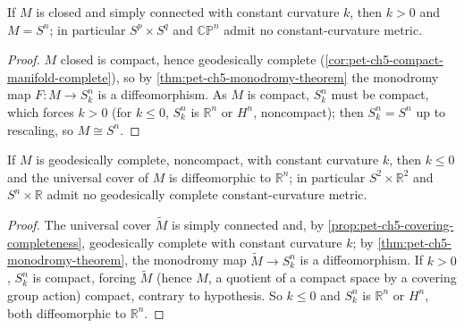 \begin{corollary}
  \label{cor:pet-ch5-closed-simply-connected-constant-curvature}
  If $M$ is closed and simply connected with constant curvature $k$, then $k>0$
  and $M=S^n$; in particular $S^p\times S^q$ and $\mathbb{CP}^n$ admit no
  constant-curvature metric.
\end{corollary}
\begin{proof}
  $M$ closed is compact, hence geodesically complete
  (\cref{cor:pet-ch5-compact-manifold-complete}), so by
  \cref{thm:pet-ch5-monodromy-theorem} the monodromy map $F:M\to S^n_k$ is a
  diffeomorphism. As $M$ is compact, $S^n_k$ must be compact, which forces $k>0$
  (for $k\le0$, $S^n_k$ is $\mathbb R^n$ or $H^n$, noncompact); then $S^n_k=S^n$ up
  to rescaling, so $M\cong S^n$.
\end{proof}

\begin{corollary}
  \label{cor:pet-ch5-noncompact-constant-curvature}
  If $M$ is geodesically complete, noncompact, with constant curvature $k$, then
  $k\le0$ and the universal cover of $M$ is diffeomorphic to $\mathbb R^n$; in
  particular $S^2\times\mathbb R^2$ and $S^n\times\mathbb R$ admit no geodesically
  complete constant-curvature metric.
\end{corollary}
\begin{proof}
  The universal cover $\tilde M$ is simply connected and, by
  \cref{prop:pet-ch5-covering-completeness}, geodesically complete with constant
  curvature $k$; by \cref{thm:pet-ch5-monodromy-theorem}, the monodromy map
  $\tilde M\to S^n_k$ is a diffeomorphism. If $k>0$, $S^n_k$ is compact, forcing
  $\tilde M$ (hence $M$, a quotient of a compact space by a covering group action)
  compact, contrary to hypothesis. So $k\le0$ and $S^n_k$ is $\mathbb R^n$ or $H^n$,
  both diffeomorphic to $\mathbb R^n$.
\end{proof}

